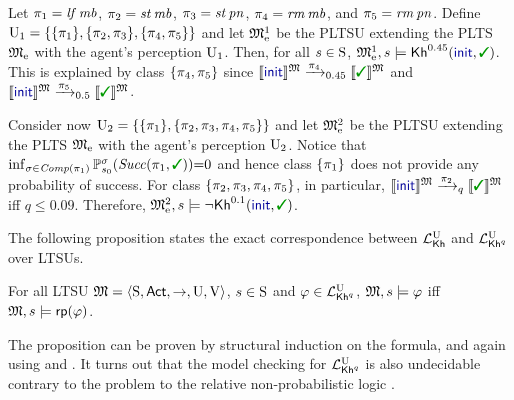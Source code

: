 \begin{example}\label{ex:running:pkhunc}
  Let
  $\plan_1 = \lift\,\mobile$, $\plan_2 = \stairs\,\mobile$,
  $\plan_3 = \stairs\,\panic$, $\plan_4 = \ramp\,\mobile$, and
  $\plan_5 = \ramp\,\panic$.
  Define
  $\Unc_1 = \{ \{\plan_1\}, \{\plan_2,\plan_3\}, \{\plan_4,\plan_5\}\}$
  and let $\modelex^1$ be the PLTSU extending the PLTS $\modelex$ with
  the agent's perception $\Unc_1$.
  Then, for all $s\in\S$,
  $\modelex^1,s \models \kh^{0.45}(\init,\goal)$.
  This is explained by class $\{\plan_4,\plan_5\}$ since
  $\truthset{\model}{\init}\reach{\plan_4}_{0.45}\truthset{\model}{\goal}$
  and
  $\truthset{\model}{\init}\reach{\plan_5}_{0.5}\truthset{\model}{\goal}$.

  Consider now
  $\Unc_2 = \{ \{\plan_1\}, \{\plan_2,\plan_3,\plan_4,\plan_5\}\}$
  and let $\modelex^2$ be the PLTSU extending the PLTS $\modelex$ with
  the agent's perception $\Unc_2$.
  Notice that
  $\inf_{\strat\in\Comp(\plan_1)}\Prob^\strat_{s_0}(\Succ(\plan_1,\goal)){=}0$
  and hence class $\{\plan_1\}$ does not provide any probability of
  success.
  For class $\{\plan_2,\plan_3,\plan_4,\plan_5\}$, in particular,
  $\truthset{\model}{\init}\reach{\plan_2}_q\truthset{\model}{\goal}$
  iff $q\leq 0.09$.
  Therefore, $\modelex^2, s \models \neg \kh^{0.1}(\init,\goal)$.
\end{example}


The following proposition states the exact correspondence between
$\Khunc$ and $\PKhunc$ over LTSUs.
%
%
\begin{proposition}\label{prop:Khunc:PKhunc}
    For all LTSU $\model = \tup{\S,\Act,\ra,\Unc,\V}$, $s\in\S$ and
    $\varphi\in\PKhunc$,
    $\model,s\models\varphi$ iff $\model,s\models\fgetprob(\varphi)$.
\end{proposition}

The proposition can be proven by structural induction on
the formula, and again using  and .
It turns out that the model checking for $\PKhunc$ is also undecidable
contrary to the \PTIME problem to the relative non-probabilistic logic
\cite{DF23}.


